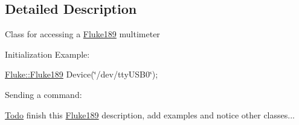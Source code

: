 \subsection{Detailed Description}
Class for accessing a \hyperlink{classFluke_1_1Fluke189}{Fluke189} multimeter\par


Initialization Example:\par
 \hyperlink{classFluke_1_1Fluke189}{Fluke::Fluke189} Device(\char`\"{}/dev/ttyUSB0\char`\"{});\par


Sending a command:\par
 \begin{Desc}
\item[\hyperlink{todo__todo000001}{Todo}]finish this \hyperlink{classFluke_1_1Fluke189}{Fluke189} description, add examples and notice other classes...\end{Desc}


